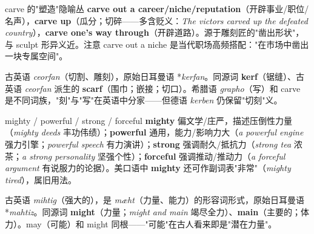 \documentclass[../main.tex]{subfiles}
\begin{document}

\begin{gram}{carve 的"塑造"隐喻丛}
\textbf{carve out a career/niche/reputation}（开辟事业/职位/名声），\textbf{carve up}（瓜分；切碎——多含贬义：\textit{The victors carved up the defeated country}），\textbf{carve one's way through}（开辟道路）。源于雕刻匠的"凿出形状"，与 sculpt 形异义近。注意 carve out a niche 是当代职场高频搭配："在市场中凿出一块专属空间"。
\end{gram}

\begin{origin}
古英语 \textit{ceorfan}（切割、雕刻），原始日耳曼语 *\textit{kerfan}。同源词 \textbf{kerf}（锯缝）、古英语 \textit{ceorfan} 派生的 \textbf{scarf}（围巾；嵌接；切口）。希腊语 \textit{grapho}（写）和 carve 是不同词族，"刻"与"写"在英语中分家——但德语 \textit{kerben} 仍保留"切刻"义。
\end{origin}




\begin{lex}{mighty / powerful / strong / forceful}
\textbf{mighty} 偏文学/庄严，描述压倒性力量（\textit{mighty deeds} 丰功伟绩）；\textbf{powerful} 通用，能力/影响力大（\textit{a powerful engine} 强力引擎；\textit{powerful speech} 有力演讲）；\textbf{strong} 强调耐久/抵抗力（\textit{strong tea} 浓茶；\textit{a strong personality} 坚强个性）；\textbf{forceful} 强调推动/推动力（\textit{a forceful argument} 有说服力的论据）。美口语中 \textbf{mighty} 还可作副词表"非常"（\textit{mighty tired}），属旧用法。
\end{lex}

\begin{origin}
古英语 \textit{mihtig}（强大的），是 \textit{mæht}（力量、能力）的形容词形式，原始日耳曼语 *\textit{mahtiz}。同源词 \textbf{might}（力量；\textit{might and main} 竭尽全力）、\textbf{main}（主要的；体力）。may（可能）和 might 同根——"可能"在古人看来即是"潜在力量"。
\end{origin}
\end{document}
